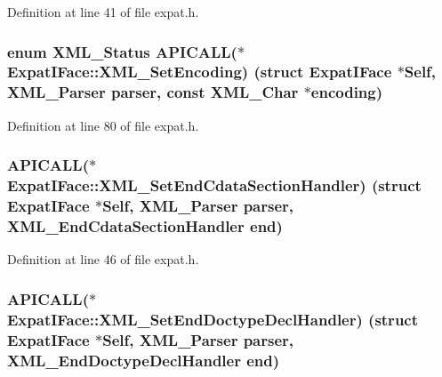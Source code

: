 Definition at line 41 of file expat.\+h.

\subsubsection[{\texorpdfstring{X\+M\+L\+\_\+\+Set\+Encoding}{XML_SetEncoding}}]{\setlength{\rightskip}{0pt plus 5cm}enum {\bf X\+M\+L\+\_\+\+Status} A\+P\+I\+C\+A\+LL($\ast$ Expat\+I\+Face\+::\+X\+M\+L\+\_\+\+Set\+Encoding) (struct {\bf Expat\+I\+Face} $\ast$Self, {\bf X\+M\+L\+\_\+\+Parser} parser, {\bf const} {\bf X\+M\+L\+\_\+\+Char} $\ast${\bf encoding})}\hypertarget{struct_expat_i_face_ab9b60e4f109a9b50a2d9351787d5d0d3}{}\label{struct_expat_i_face_ab9b60e4f109a9b50a2d9351787d5d0d3}


Definition at line 80 of file expat.\+h.

\subsubsection[{\texorpdfstring{X\+M\+L\+\_\+\+Set\+End\+Cdata\+Section\+Handler}{XML_SetEndCdataSectionHandler}}]{ A\+P\+I\+C\+A\+LL($\ast$ Expat\+I\+Face\+::\+X\+M\+L\+\_\+\+Set\+End\+Cdata\+Section\+Handler) (struct {\bf Expat\+I\+Face} $\ast$Self, {\bf X\+M\+L\+\_\+\+Parser} parser, {\bf X\+M\+L\+\_\+\+End\+Cdata\+Section\+Handler} {\bf end})}\hypertarget{struct_expat_i_face_af64bcd70df9b9449103e035fc1ec2b2b}{}\label{struct_expat_i_face_af64bcd70df9b9449103e035fc1ec2b2b}


Definition at line 46 of file expat.\+h.

\subsubsection[{\texorpdfstring{X\+M\+L\+\_\+\+Set\+End\+Doctype\+Decl\+Handler}{XML_SetEndDoctypeDeclHandler}}]{ A\+P\+I\+C\+A\+LL($\ast$ Expat\+I\+Face\+::\+X\+M\+L\+\_\+\+Set\+End\+Doctype\+Decl\+Handler) (struct {\bf Expat\+I\+Face} $\ast$Self, {\bf X\+M\+L\+\_\+\+Parser} parser, {\bf X\+M\+L\+\_\+\+End\+Doctype\+Decl\+Handler} {\bf end})}\hypertarget{struct_expat_i_face_a384b7fbbcabb8d3761072100e66e7335}{}\label{struct_expat_i_face_a384b7fbbcabb8d3761072100e66e7335}


